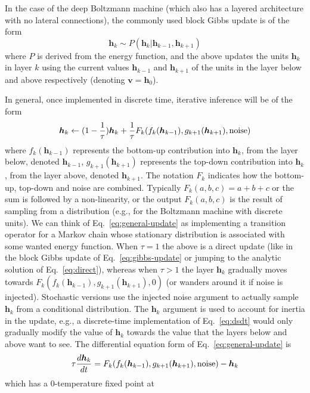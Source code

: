 \documentclass{article}
\newcommand   \vv{{\bm v}}
\newcommand   \vh{{\bm h}}
\begin{document}
In the case of the deep Boltzmann machine (which also has a layered architecture
with no lateral connections), the commonly used block Gibbs update is of the form
\begin{equation}
  \label{eq:gibbs-update}
  \vh_k \sim P(\vh_k | \vh_{k-1}, \vh_{k+1})
\end{equation}
where $P$ is derived from the energy function, and the above
updates the units $\vh_k$ in layer $k$ using the current values $\vh_{k-1}$ and $\vh_{k+1}$ of the
units in the layer below and above respectively (denoting $\vv=\vh_0$).

In general, once implemented in discrete time, iterative inference will be of the form
\begin{equation}
  \label{eq:general-update}
  \vh_k \leftarrow (1-\frac{1}{\tau}) \vh_k + \frac{1}{\tau} F_k(f_k(\vh_{k-1}),g_{k+1}(\vh_{k+1}),{\rm noise})
\end{equation}
where $f_k(\vh_{k-1})$ represents the bottom-up contribution into $\vh_k$, from the layer below, denoted $\vh_{k-1}$,
$g_{k+1}(\vh_{k+1})$ represents the top-down contribution into $\vh_k$, from the layer above, denoted $\vh_{k+1}$.
The notation $F_k$ indicates how the bottom-up, top-down and noise are combined. Typically $F_k(a,b,c)=a+b+c$
or the sum is followed by a non-linearity, or the output $F_k(a,b,c)$ is the result of sampling from a distribution
(e.g., for the Boltzmann machine with discrete units).
We can think of Eq.~\ref{eq:general-update} as implementing a transition operator for
a Markov chain whose stationary distribution is associated with some wanted energy function.
When $\tau=1$ the above is a direct update (like in the block Gibbs update of Eq.~\ref{eq:gibbs-update}
or jumping to the analytic solution of Eq.~\ref{eq:direct}), whereas when $\tau>1$ the layer $\vh_k$
gradually moves towards $F_k(f_k(\vh_{k-1}),g_{k+1}(\vh_{k+1}),0)$ (or wanders around it if noise is injected).
Stochastic versions use the injected noise argument to actually sample $\vh_k$ from a conditional
distribution. The $\vh_k$ argument is used to account for inertia in the update, e.g., a discrete-time
implementation of Eq.~\ref{eq:dsdt} would only gradually modify the value of $\vh_k$ towards the
value that the layers below and above want to see.
The differential equation form of Eq.~\ref{eq:general-update} is
\begin{equation}
  \label{eq:dhdt}
  \tau \frac{d\vh_k}{dt} = F_k(f_k(\vh_{k-1}),g_{k+1}(\vh_{k+1}),{\rm noise}) - \vh_k
\end{equation}
which has a 0-temperature fixed point at
\end{document}
